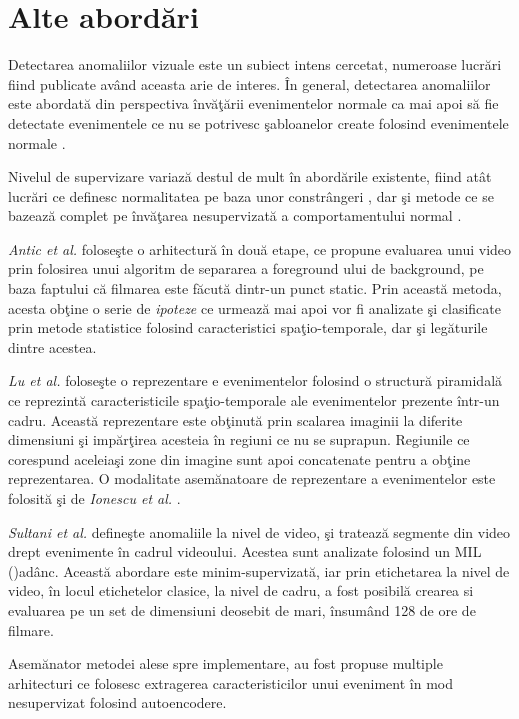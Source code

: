 \documentclass[a4paper,12pt]{report}
\begin{document}
\section{Alte abordări}
\quad Detectarea anomaliilor vizuale este un subiect intens cercetat, numeroase lucrări fiind publicate având aceasta arie de interes. În general, detectarea anomaliilor este abordată din perspectiva învăţării evenimentelor normale ca mai apoi să fie detectate evenimentele ce nu se potrivesc şabloanelor create folosind evenimentele normale \cite{cheng2015,ionescu2019object,sultani2018,smeureanu2018,alexe2018}.
\par Nivelul de supervizare variază destul de mult în abordările existente, fiind atât lucrări ce definesc normalitatea pe baza unor constrângeri \cite{hannah2004,shet2006}, dar şi metode ce se bazează complet pe învăţarea nesupervizată a comportamentului normal \cite{dutta2015,zhao2011}. 
\par\emph{Antic et al.} \cite{borislav2011} foloseşte o arhitectură în două etape, ce propune evaluarea unui video prin folosirea unui algoritm de separarea a foreground ului de background, pe baza faptului că filmarea este făcută dintr-un punct static. Prin această metoda, acesta obţine o serie de \emph{ipoteze} ce urmează mai apoi vor fi analizate şi clasificate prin metode statistice folosind caracteristici spaţio-temporale, dar şi legăturile dintre acestea.
\par \emph{Lu et al.} \cite{lu2013} foloseşte o reprezentare e evenimentelor folosind o structură piramidală ce reprezintă caracteristicile spaţio-temporale ale evenimentelor prezente într-un cadru. Această reprezentare este obţinută prin scalarea imaginii la diferite dimensiuni şi impărţirea acesteia în regiuni ce nu se suprapun. Regiunile ce corespund aceleiaşi zone din imagine sunt apoi concatenate pentru a obţine reprezentarea. O modalitate asemănatoare de reprezentare a evenimentelor este folosită şi de \emph{Ionescu et al.} \cite{smeureanu2018}.  
\par \emph{Sultani et al.} \cite{sultani2018} defineşte anomaliile la nivel de video, şi tratează segmente din video drept evenimente în cadrul videoului. Acestea sunt analizate folosind un MIL ()adânc. Această abordare este minim-supervizată, iar prin etichetarea la nivel de video, în locul etichetelor clasice, la nivel de cadru, a fost posibilă crearea si evaluarea pe un set de dimensiuni deosebit de mari, însumând 128 de ore de filmare.
\par Asemănator metodei alese spre implementare\cite{ionescu2019object}, au fost propuse multiple arhitecturi \cite{sobokrou2017,xu2015} ce folosesc extragerea caracteristicilor unui eveniment în mod nesupervizat folosind autoencodere. 
\end{document}
